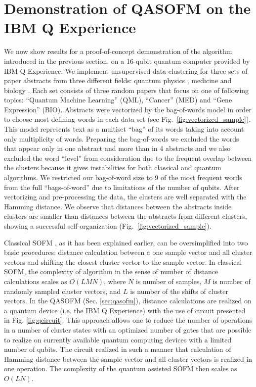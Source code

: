\documentclass[pra,showkeys,twocolumn,showpacs]{revtex4-1}
\begin{document}
\section{Demonstration of QASOFM on the IBM Q Experience}

We now show results for a proof-of-concept demonstration of the algorithm introduced in the previous section, on a 16-qubit quantum computer provided by IBM Q Experience.  
We implement unsupervised data clustering for three sets of paper abstracts from three different fields: quantum physics \cite{qml0, qml1, qml2}, medicine \cite{med0, med1, med2} and biology \cite{bio0, bio1, bio2}. 
Each set consists of three random papers that focus on one of following topics: ``Quantum Machine Learning'' (QML), ``Cancer'' (MED) and ``Gene Expression'' (BIO). 
Abstracts were vectorized by the bag-of-words model in order to choose most defining words in each data set (see Fig.~\ref{fig:vectorized_sample}). 
This model represents text as a multiset ``bag'' of its words taking into account only multiplicity of words. 
Preparing the bag-of-words we excluded the words that appear only in one abstract and more than in 4 abstracts and we also excluded the word ``level'' from consideration due to the frequent overlap between the clusters because it gives instabilities for both classical and quantum algorithms. 
We restricted our bag-of-word size to 9 of the most frequent words from the full ``bags-of-word''  due to limitations of the number of qubits. 
After vectorizing and pre-processing  the data, the clusters are well separated with the Hamming distance.  
We observe that distances between the abstracts inside clusters are smaller than distances between the abstracts from different clusters, showing a successful self-organization (Fig.~\ref{fig:vectorized_sample}). 


Classical SOFM \cite{kohonen1990}, as it has been explained earlier, can be oversimplified into two basic procedures: distance calculation between a one sample vector and all cluster vectors and shifting the closest cluster vector to the sample vector. 
In classical SOFM, the complexity of algorithm in the sense of number of distance calculations scales as $O(LMN)$, where $N$ is number of samples, $M$ is number of randomly sampled cluster vectors, and $L$ is number of the shifts of cluster vectors.  
In the QASOFM (Sec. \ref{sec:qasofm}), distance calculations are realized on a quantum device (i.e. the IBM Q Experience) with the use of circuit presented in Fig. \ref{fig:qcircuit}. 
This approach allows one to reduce the number of operations in a number of cluster states with an optimized number of gates that are possible to realize on currently available quantum computing devices with a limited number of qubits. 
The circuit realized in such a manner that calculation of Hamming distance between the sample vector and all cluster vectors is realized in one operation. 
The complexity of the quantum assisted SOFM then scales as $O(LN)$. 
\end{document}
